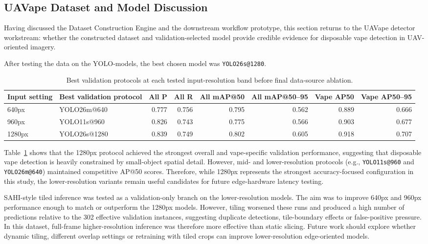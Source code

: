 \subsection{UAVape Dataset and Model Discussion}

Having discussed the Dataset Construction Engine and the downstream workflow prototype, this section returns to the UAVape detector workstream: whether the constructed dataset and validation-selected model provide credible evidence for disposable vape detection in UAV-oriented imagery.

After testing the data on the YOLO-models, the best chosen model was \texttt{YOLO26s@1280}.

\begin{table}[H]
\centering
\scriptsize
\renewcommand{\arraystretch}{1.2}
\begin{tabularx}{\textwidth}{p{} p{} r r r r r r}
\toprule
\textbf{Input setting} & \textbf{Best validation protocol} & \textbf{All P} & \textbf{All R} & \textbf{All mAP@50} & \textbf{All mAP@50--95} & \textbf{Vape AP50} & \textbf{Vape AP50--95} \\
\midrule
640px & YOLO26m@640 & 0.777 & 0.756 & 0.795 & 0.562 & 0.889 & 0.666 \\
960px & YOLO11s@960 & 0.826 & 0.743 & 0.775 & 0.566 & 0.903 & 0.677 \\
1280px & YOLO26s@1280 & 0.839 & 0.749 & 0.802 & 0.605 & 0.918 & 0.707 \\
\bottomrule
\end{tabularx}
\caption{Best validation protocols at each tested input-resolution band before final data-source ablation.}
\label{tab:discussion_resolution_comparison}
\end{table}

Table~\ref{tab:discussion_resolution_comparison} shows that the 1280px protocol achieved the strongest overall and vape-specific validation performance, suggesting that disposable vape detection is heavily constrained by small-object spatial detail. However, mid- and lower-resolution protocols (e.g., \texttt{YOLO11s@960} and \texttt{YOLO26m@640}) maintained competitive AP@50 scores. Therefore, while 1280px represents the strongest accuracy-focused configuration in this study, the lower-resolution variants remain useful candidates for future edge-hardware latency testing.

SAHI-style tiled inference was tested as a validation-only branch on the lower-resolution models. The aim was to improve 640px and 960px performance enough to match or outperform the 1280px models. However, tiling worsened these runs and produced a high number of predictions relative to the 302 effective validation instances, suggesting duplicate detections, tile-boundary effects or false-positive pressure. In this dataset, full-frame higher-resolution inference was therefore more effective than static slicing. Future work should explore whether dynamic tiling, different overlap settings or retraining with tiled crops can improve lower-resolution edge-oriented models.

